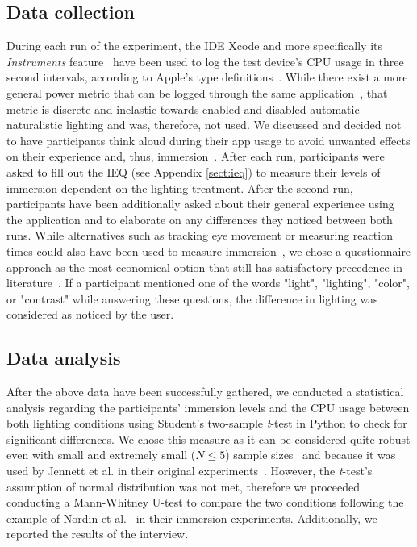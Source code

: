 \documentclass[12pt,twoside,english]{article}
\begin{document}
\subsection{Data collection}
\label{sect:data_collection}

During each run of the experiment, the \gls{IDE} Xcode and more specifically its \textit{Instruments} feature~\cite{apple_xcode_2020} have been used to log the test device's \gls{CPU} usage in three second intervals, according to Apple's type definitions~\cite{apple_system_2020}.
While there exist a more general power metric that can be logged through the same application~\cite{apple_energy_2020-1}, that metric is discrete and inelastic towards enabled and disabled automatic naturalistic lighting and was, therefore, not used.
We discussed and decided not to have participants think aloud during their app usage to avoid unwanted effects on their experience and, thus, immersion~\cite{van_den_haak_retrospective_2003}.
After each run, participants were asked to fill out the \gls{IEQ} (see Appendix \ref{sect:ieq}) to measure their levels of immersion dependent on the lighting treatment.
After the second run, participants have been additionally asked about their general experience using the application and to elaborate on any differences they noticed between both runs.
While alternatives such as tracking eye movement or measuring reaction times could also have been used to measure immersion~\cite{jennett_measuring_2008}, we chose a questionnaire approach as the most economical option that still has satisfactory precedence in literature~\cite{boyle_engagement_2012}.
If a participant mentioned one of the words "light", "lighting", "color", or "contrast" while answering these questions, the difference in lighting was considered as noticed by the user.

\subsection{Data analysis}
\label{sect:data_analysis}

After the above data have been successfully gathered, we conducted a statistical analysis regarding the participants' immersion levels and the \gls{CPU} usage between both lighting conditions using Student's two-sample \textit{t}-test in Python to check for significant differences.
We chose this measure as it can be considered quite robust even with small and extremely small ($ N \leq 5 $) sample sizes~\cite{de_winter_using_2013} and because it was used by Jennett et al. in their original experiments~\cite{jennett_measuring_2008}.
However, the \textit{t}-test's assumption of normal distribution was not met, therefore we proceeded conducting a Mann-Whitney U-test to compare the two conditions following the example of Nordin et al.~\cite{nordin_attention_2013} in their immersion experiments.
Additionally, we reported the results of the interview.
\end{document}
